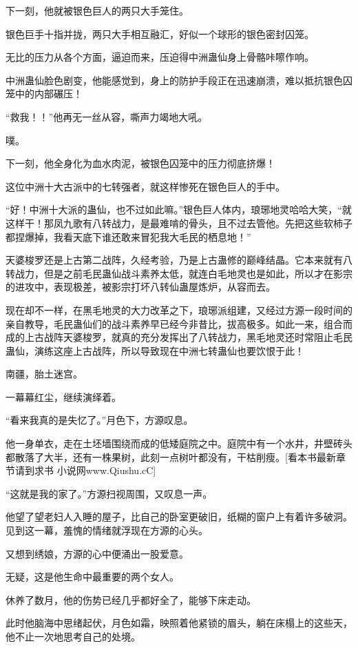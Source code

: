 \begin{this_body}
下一刻，他就被银色巨人的两只大手笼住。

银色巨手十指并拢，两只大手相互融汇，好似一个球形的银色密封囚笼。

无比的压力从各个方面，逼迫而来，压迫得中洲蛊仙身上骨骼咔嚓作响。

中洲蛊仙脸色剧变，他能感觉到，身上的防护手段正在迅速崩溃，难以抵抗银色囚笼中的内部碾压！

“救我！！”他再无一丝从容，嘶声力竭地大吼。

噗。

下一刻，他全身化为血水肉泥，被银色囚笼中的压力彻底挤爆！

这位中洲十大古派中的七转强者，就这样惨死在银色巨人的手中。

“好！中洲十大派的蛊仙，也不过如此嘛。”银色巨人体内，琅琊地灵哈哈大笑，“就这样干！那凤九歌有八转战力，是最难啃的骨头，且不过去管他。先把这些软柿子都捏爆掉，我看天底下谁还敢来冒犯我大毛民的栖息地！”

天婆梭罗还是上古第二战阵，久经考验，乃是上古蛊修的巅峰结晶。它本来就有八转战力，但是之前毛民蛊仙战斗素养太低，就连白毛地灵也是如此，所以才在影宗的进攻中，表现极差，被影宗打坏八转仙蛊屋炼炉，从容而去。

现在却不一样，在黑毛地灵的大力改革之下，琅琊派组建，又经过方源一段时间的亲自教导，毛民蛊仙们的战斗素养早已经今非昔比，拔高极多。如此一来，组合而成的上古战阵天婆梭罗，就真的充分发挥出了八转战力，黑毛地灵还时常阻止毛民蛊仙，演练这座上古战阵，所以导致现在中洲七转蛊仙也要饮恨于此！

南疆，胎土迷宫。

一幕幕红尘，继续演绎着。

“看来我真的是失忆了。”月色下，方源叹息。

他一身单衣，走在土坯墙围绕而成的低矮庭院之中。庭院中有一个水井，井壁砖头都散落了大半，还有一株果树，此刻一点树叶都没有，干枯削瘦。[看本书最新章节请到求书 小说网www.Qiushu.cC]

“这就是我的家了。”方源扫视周围，又叹息一声。

他望了望老妇人入睡的屋子，比自己的卧室更破旧，纸糊的窗户上有着许多破洞。见到这一幕，羞愧的情绪就浮现在方源的心头。

又想到绣娘，方源的心中便涌出一股爱意。

无疑，这是他生命中最重要的两个女人。

休养了数月，他的伤势已经几乎都好全了，能够下床走动。

此时他脑海中思绪起伏，月色如霜，映照着他紧锁的眉头，躺在床榻上的这些天，他不止一次地思考自己的处境。


\end{this_body}
